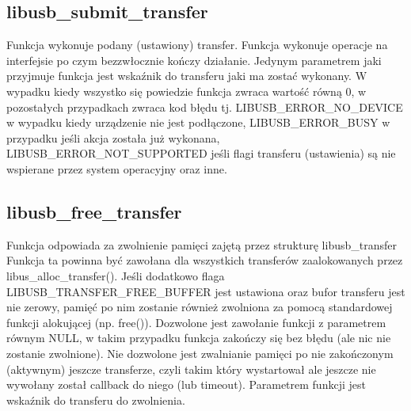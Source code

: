 \documentclass{BscUS}
\begin{document}
\subsection{libusb\_submit\_transfer}
Funkcja wykonuje podany (ustawiony) transfer.
\newline
Funkcja wykonuje operacje na interfejsie po czym bezzwłocznie kończy działanie.
\newline
Jedynym parametrem jaki przyjmuje funkcja jest wskaźnik do transferu jaki ma zostać wykonany.
\newline
W wypadku kiedy wszystko się powiedzie funkcja zwraca wartość równą 0, w pozostałych przypadkach zwraca kod błędu tj. LIBUSB\_ERROR\_NO\_DEVICE w wypadku kiedy urządzenie nie jest podłączone, LIBUSB\_ERROR\_BUSY w przypadku jeśli akcja została już wykonana, LIBUSB\_ERROR\_NOT\_SUPPORTED jeśli flagi transferu (ustawienia) są nie wspierane przez system operacyjny oraz inne.
\subsection{libusb\_free\_transfer}
Funkcja odpowiada za zwolnienie pamięci zajętą przez strukturę libusb\_transfer
\newline
Funkcja ta powinna być zawołana dla wszystkich transferów zaalokowanych przez libus\_alloc\_transfer().
\newline
Jeśli dodatkowo flaga LIBUSB\_TRANSFER\_FREE\_BUFFER jest ustawiona oraz bufor transferu jest nie zerowy, pamięć po nim zostanie również zwolniona za pomocą standardowej funkcji alokującej (np. free()).
\newline
Dozwolone jest zawołanie funkcji z parametrem równym NULL, w takim przypadku funkcja zakończy się bez błędu (ale nic nie zostanie zwolnione).
\newline
Nie dozwolone jest zwalnianie pamięci po nie zakończonym (aktywnym) jeszcze transferze, czyli takim który wystartował ale jeszcze nie wywołany został callback do niego (lub timeout).
\newline
Parametrem funkcji jest wskaźnik do transferu do zwolnienia.

\end{document}
